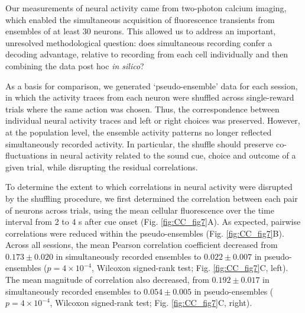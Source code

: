Our measurements of neural activity came from two-photon calcium imaging, which enabled the simultaneous acquisition of fluorescence transients from ensembles of at least 30 neurons. This allowed us to address an important, unresolved methodological question: does simultaneous recording confer a decoding advantage, relative to recording from each cell individually and then combining the data post hoc \textit{in silico}?

As a basis for comparison, we generated ‘pseudo-ensemble’ data for each session, in which the activity traces from each neuron were shuffled across single-reward trials where the same action was chosen. Thus, the correspondence between individual neural activity traces and left or right choices was preserved. However, at the population level, the ensemble activity patterns no longer reflected simultaneously recorded activity. In particular, the shuffle should preserve co-fluctuations in neural activity related to the sound cue, choice and outcome of a given trial, while disrupting the residual correlations.

To determine the extent to which correlations in neural activity were disrupted by the shuffling procedure, we first determined the correlation between each pair of neurons across trials, using the mean cellular fluorescence over the time interval from 2 to 4 s after cue onset (Fig. \ref{fig:CC_fig7}A). As expected, pairwise correlations were reduced within the pseudo-ensembles (Fig. \ref{fig:CC_fig7}B). Across all sessions, the mean Pearson correlation coefficient decreased from $0.173 \pm 0.020$ in simultaneously recorded ensembles to $0.022 \pm 0.007$ in pseudo-ensembles ($p = 4 \times 10^{-4}$, Wilcoxon signed-rank test; Fig. \ref{fig:CC_fig7}C, left). The mean magnitude of correlation also decreased, from $0.192 \pm 0.017$ in simultaneously recorded ensembles to $0.054 \pm 0.005$ in pseudo-ensembles ($p = 4 \times 10^{-4}$, Wilcoxon signed-rank test; Fig. \ref{fig:CC_fig7}C, right).



